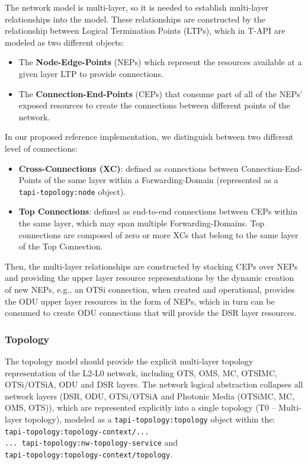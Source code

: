 \documentclass[a4paper,fleqn]{cas-dc}
\begin{document}
The network model is multi-layer, so it is needed to establish multi-layer relationships into the model. These relationships are constructed by the relationship between Logical Termination Points (LTPs), which in T-API are modeled as two different objects: 
\begin{itemize}
    \item The \textbf{Node-Edge-Points} (NEPs) which represent the resources available at a given layer LTP to provide connections.
    \item The \textbf{Connection-End-Points} (CEPs) that consume part of all of the NEPs’ exposed resources to create the connections between different points of the network.
\end{itemize}

In our proposed reference implementation, we distinguish between two different level of connections:

\begin{itemize}
    \item \textbf{Cross-Connections (XC)}: defined as connections between Connection-End-Points of the same layer within a Forwarding-Domain (represented as a\\ \texttt{tapi-topology:node} object). 
    \item \textbf{Top Connections}: defined as end-to-end connections between CEPs within the same layer, which may span multiple Forwarding-Domains. Top connections are composed of zero or more XCs that belong to the same layer of the Top Connection.
\end{itemize}

Then, the multi-layer relationships are constructed by stacking CEPs over NEPs and providing the upper layer resource representations by the dynamic creation of new NEPs, e.g., an OTSi connection, when created and operational, provides the ODU upper layer resources in the form of NEPs, which in turn can be consumed to create ODU connections that will provide the DSR layer resources.

\subsubsection{Topology}
\label{subsection:OPTopo}

The topology model should provide the explicit multi-layer topology representation of the L2-L0 network, including OTS, OMS, MC, OTSIMC, OTSi/OTSiA, ODU and DSR layers. The network logical abstraction collapses all network layers (DSR, ODU, OTSi/OTSiA and Photonic Media (OTSiMC, MC, OMS, OTS)), which are represented explicitly into a single topology (T0 – Multi-layer topology), modeled as a \texttt{tapi-topology:topology} object within the: \\
\texttt{tapi-topology:topology-context/... \\
... tapi-topology:nw-topology-service} and \\ \texttt{tapi-topology:topology-context/topology}. 
\end{document}

